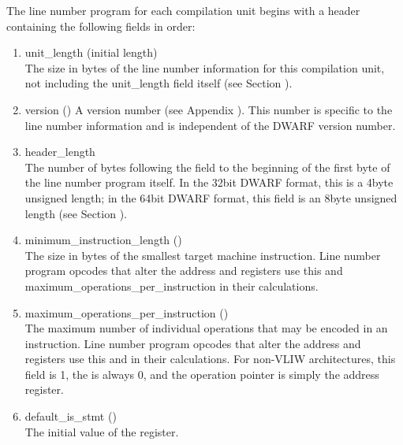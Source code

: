 The line number program for each compilation unit begins with
a header containing the following fields in order:

\begin{enumerate}[1. ]
\item unit\_length (initial length)  \\
The size in bytes of the line number information for this
compilation unit, not including the unit\_length field itself
(see Section ). 

\item version () 
A version number 
(see Appendix ). 
This number is specific to
the line number information and is independent of the DWARF
version number. 

\item header\_length  \\
The number of bytes following the  field to the
beginning of the first byte of the line number program itself.
In the 32\dash bit DWARF format, this is a 4\dash byte unsigned
length; in the 64\dash bit DWARF format, this field is an
8\dash byte unsigned length 
(see Section ). 

\item minimum\_instruction\_length ()  \\
The size in bytes of the smallest target machine
instruction. Line number program opcodes that alter
the address and  registers use this and
maximum\-\_operations\-\_per\-\_instruction in their calculations. 

\item maximum\_operations\_per\_instruction () \\
The 
maximum number of individual operations that may be
encoded in an instruction. Line number program opcodes
that alter the address and 
 registers use this and
in their calculations.
For non-VLIW
architectures, this field is 1, the  is always
0, and the operation pointer is simply the address register.

\item default\_is\_stmt () \\
The initial value of the  register.  


\end{enumerate}
